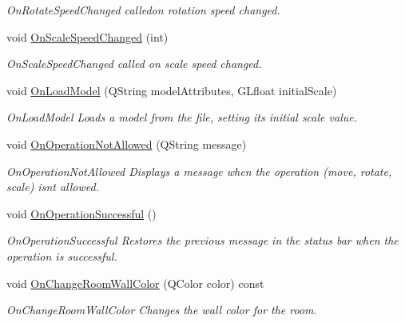 \begin{DoxyCompactItemize}
\begin{DoxyCompactList}\small\item\em On\+Rotate\+Speed\+Changed calledon rotation speed changed. \end{DoxyCompactList}\item 
\hypertarget{class_home_designer_open_g_l_widget_a0f69f807f678735ce1d7ba41a7d495c3}{}void \hyperlink{class_home_designer_open_g_l_widget_a0f69f807f678735ce1d7ba41a7d495c3}{On\+Scale\+Speed\+Changed} (int)\label{class_home_designer_open_g_l_widget_a0f69f807f678735ce1d7ba41a7d495c3}

\begin{DoxyCompactList}\small\item\em On\+Scale\+Speed\+Changed called on scale speed changed. \end{DoxyCompactList}\item 
void \hyperlink{class_home_designer_open_g_l_widget_a4162c2eef3980d6a2f594c0c40bd169a}{On\+Load\+Model} (Q\+String model\+Attributes, G\+Lfloat initial\+Scale)
\begin{DoxyCompactList}\small\item\em On\+Load\+Model Loads a model from the file, setting its initial scale value. \end{DoxyCompactList}\item 
void \hyperlink{class_home_designer_open_g_l_widget_a0b14ecff70d70ec52b9ddced64ff4a2c}{On\+Operation\+Not\+Allowed} (Q\+String message)
\begin{DoxyCompactList}\small\item\em On\+Operation\+Not\+Allowed Displays a message when the operation (move, rotate, scale) isn\textquotesingle{}t allowed. \end{DoxyCompactList}\item 
void \hyperlink{class_home_designer_open_g_l_widget_ac9f66e0dc6799b7e48d6866d4322fa89}{On\+Operation\+Successful} ()
\begin{DoxyCompactList}\small\item\em On\+Operation\+Successful Restores the previous message in the status bar when the operation is successful. \end{DoxyCompactList}\item 
void \hyperlink{class_home_designer_open_g_l_widget_a18d664925e2c18855722e5300169f229}{On\+Change\+Room\+Wall\+Color} (Q\+Color color) const 
\begin{DoxyCompactList}\small\item\em On\+Change\+Room\+Wall\+Color Changes the wall color for the room. \end{DoxyCompactList}\item 

\end{DoxyCompactItemize}
